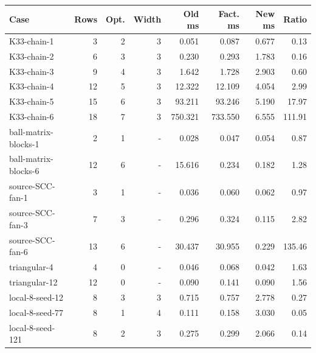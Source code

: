 \begin{tabular}{lrrrrrrr}
\toprule
Case & Rows & Opt. & Width & Old ms & Fact. ms & New ms & Ratio\\
\midrule
K33-chain-1 & 3 & 2 & 3 & 0.051 & 0.087 & 0.677 & 0.13\\
K33-chain-2 & 6 & 3 & 3 & 0.230 & 0.293 & 1.783 & 0.16\\
K33-chain-3 & 9 & 4 & 3 & 1.642 & 1.728 & 2.903 & 0.60\\
K33-chain-4 & 12 & 5 & 3 & 12.322 & 12.109 & 4.054 & 2.99\\
K33-chain-5 & 15 & 6 & 3 & 93.211 & 93.246 & 5.190 & 17.97\\
K33-chain-6 & 18 & 7 & 3 & 750.321 & 733.550 & 6.555 & 111.91\\
ball-matrix-blocks-1 & 2 & 1 & - & 0.028 & 0.047 & 0.054 & 0.87\\
ball-matrix-blocks-6 & 12 & 6 & - & 15.616 & 0.234 & 0.182 & 1.28\\
source-SCC-fan-1 & 3 & 1 & - & 0.036 & 0.060 & 0.062 & 0.97\\
source-SCC-fan-3 & 7 & 3 & - & 0.296 & 0.324 & 0.115 & 2.82\\
source-SCC-fan-6 & 13 & 6 & - & 30.437 & 30.955 & 0.229 & 135.46\\
triangular-4 & 4 & 0 & - & 0.046 & 0.068 & 0.042 & 1.63\\
triangular-12 & 12 & 0 & - & 0.090 & 0.141 & 0.090 & 1.56\\
local-8-seed-12 & 8 & 3 & 3 & 0.715 & 0.757 & 2.778 & 0.27\\
local-8-seed-77 & 8 & 1 & 4 & 0.111 & 0.158 & 3.030 & 0.05\\
local-8-seed-121 & 8 & 2 & 3 & 0.275 & 0.299 & 2.066 & 0.14\\
\bottomrule
\end{tabular}
